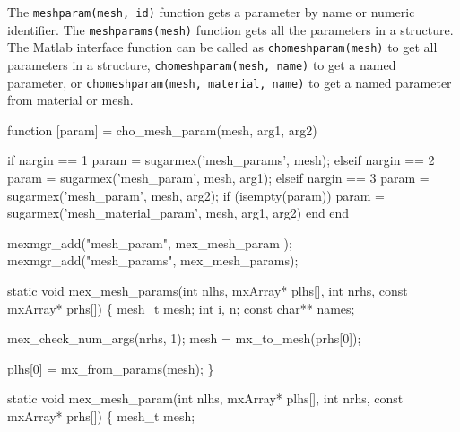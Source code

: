 The {\tt{}mesh{}param(mesh,\ id)} function gets a parameter by name or
numeric identifier.  The {\tt{}mesh{}params(mesh)} function gets all
the parameters in a structure.  The Matlab interface function
can be called as {\tt{}cho{}mesh{}param(mesh)} to get all parameters
in a structure, {\tt{}cho{}mesh{}param(mesh,\ name)} to get a named
parameter, or {\tt{}cho{}mesh{}param(mesh,\ material,\ name)} to get a named
parameter from material or mesh.

\nwenddocs{}\endmoddef
function [param] = cho_mesh_param(mesh, arg1, arg2)

if nargin == 1
    param = sugarmex('mesh_params', mesh);
elseif nargin == 2
    param = sugarmex('mesh_param', mesh, arg1);
elseif nargin == 3
    param = sugarmex('mesh_param', mesh, arg2);
    if (isempty(param))
        param = sugarmex('mesh_material_param', mesh, arg1, arg2)
    end
end
\nwendcode{}\nwdocspar

\nwenddocs{}\plusendmoddef
mexmgr_add("mesh_param",  mex_mesh_param );
mexmgr_add("mesh_params", mex_mesh_params);
\nwendcode{}\nwdocspar

\nwenddocs{}\plusendmoddef
static void mex_mesh_params(int nlhs, mxArray* plhs[],
                            int nrhs, const mxArray* prhs[])
\{
    mesh_t mesh;
    int i, n;
    const char** names;

    mex_check_num_args(nrhs, 1);
    mesh = mx_to_mesh(prhs[0]);

    plhs[0] = mx_from_params(mesh);
\}

\nwendcode{}\nwdocspar

\nwenddocs{}\plusendmoddef
static void mex_mesh_param(int nlhs, mxArray* plhs[],
                           int nrhs, const mxArray* prhs[])
\{
    mesh_t mesh;

